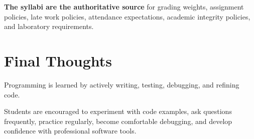 \documentclass[11pt]{article}
\begin{document}
\textbf{The syllabi are the authoritative source} for grading weights, assignment policies, late work policies, attendance expectations, academic integrity policies, and laboratory requirements.

\section{Final Thoughts}

Programming is learned by actively writing, testing, debugging, and refining code.

Students are encouraged to experiment with code examples, ask questions frequently, practice regularly, become comfortable debugging, and develop confidence with professional software tools.
\end{document}
